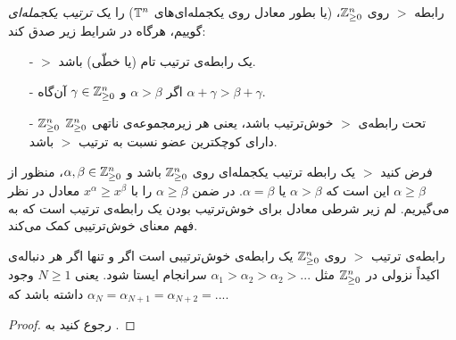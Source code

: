 \begin{definition}
رابطه‌ 
$>$
روی 
$\mathbb{Z}_{\geq 0}^{n}$، 
 (یا بطور معادل روی یکجمله‌ای‌های 
${\mathbb{T}}^{n}$)
را یک
\textit{ترتیب یکجمله‌ای}
گوییم، هرگاه در شرایط زیر صدق کند:
\begin{itemize}
\item[-]
$>$
یک رابطه‌ی ترتیب تام (یا خطّی) باشد.
\item[-]
اگر 
$\alpha > \beta$
و 
$\gamma\in \mathbb{Z}_{\geq 0}^{n}$
آن‌گاه 
$\alpha + \gamma > \beta + \gamma$.
\item[-]
$\mathbb{Z}_{\geq 0}^{n}$
تحت رابطه‌ی 
$>$
خوش‌ترتیب باشد، یعنی هر زیرمجموعه‌ی ناتهی 
$\mathbb{Z}_{\geq 0}^{n}$
دارای کوچکترین عضو نسبت به ترتیب 
$>$
باشد.
\end{itemize}
\end{definition}
 فرض کنید 
$>$
 یک رابطه‌‌‌  ترتیب یکجمله‌ای روی 
 $\mathbb{Z}_{\geq 0}^{n}$
 باشد و 
 $\alpha, \beta \in \mathbb{Z}_{\geq 0}^{n}$،
 منظور از 
 $\alpha \geq \beta$
 این است که 
 $\alpha > \beta$
 یا 
 $\alpha = \beta$.
  در ضمن 
  $\alpha \geq \beta$
   را با 
   $x^{\alpha} \geq x^{\beta}$
   معادل در نظر می‌گیریم. لم زیر شرطی معادل برای خوش‌ترتیب بودن یک رابطه‌ی ترتیب است که به فهم معنای خوش‌ترتیبی کمک می‌کند.
\begin{lemma}
	\label{wellorderinglemma}
رابطه‌ی ترتیب 
$>$
روی 
$\mathbb{Z}_{\geq 0}^{n}$
یک رابطه‌ی خوش‌ترتیبی است اگر و تنها اگر هر دنباله‌ی اکیداً نزولی در 
$\mathbb{Z}_{\geq 0}^{n}$
مثل 
$\alpha_{1}> \alpha_{2}>\alpha_{2}>...$
سرانجام ایستا شود. یعنی 
$N\geq 1$
وجود داشته باشد که 
$\alpha_{N} = \alpha_{N+1} = \alpha_{N+2} = ...$.
\end{lemma}
\begin{proof}
	رجوع کنید به 
{\small \cite{IVAcox}}.
\end{proof}
% 

